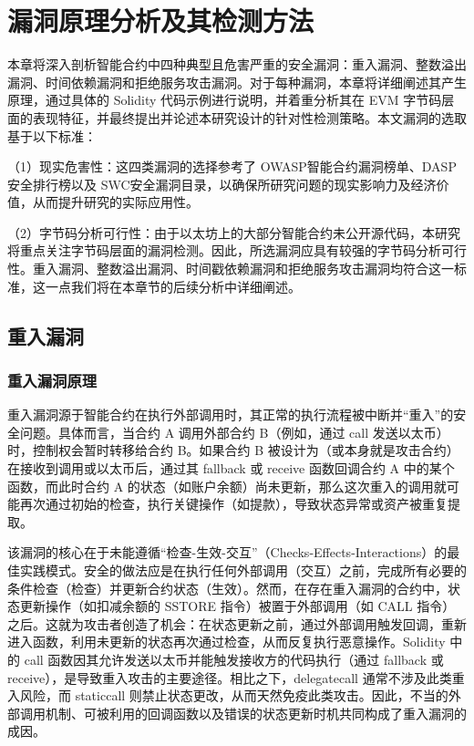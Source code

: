 \documentclass[print, master, vlined, timesmath]{DissertUESTC}
\begin{document}
\chapter{漏洞原理分析及其检测方法}
本章将深入剖析智能合约中四种典型且危害严重的安全漏洞：重入漏洞、整数溢出漏洞、时间依赖漏洞和拒绝服务攻击漏洞。对于每种漏洞，本章将详细阐述其产生原理，通过具体的 Solidity 代码示例进行说明，并着重分析其在 EVM 字节码层面的表现特征，并最终提出并论述本研究设计的针对性检测策略。本文漏洞的选取基于以下标准：

（1）现实危害性：这四类漏洞的选择参考了 OWASP智能合约漏洞榜单、DASP安全排行榜以及 SWC安全漏洞目录，以确保所研究问题的现实影响力及经济价值，从而提升研究的实际应用性。

（2）字节码分析可行性：由于以太坊上的大部分智能合约未公开源代码，本研究将重点关注字节码层面的漏洞检测。因此，所选漏洞应具有较强的字节码分析可行性。重入漏洞、整数溢出漏洞、时间戳依赖漏洞和拒绝服务攻击漏洞均符合这一标准，这一点我们将在本章节的后续分析中详细阐述。




\section{重入漏洞}

\subsection{重入漏洞原理}

重入漏洞源于智能合约在执行外部调用时，其正常的执行流程被中断并“重入”的安全问题。具体而言，当合约 A 调用外部合约 B（例如，通过 call 发送以太币）时，控制权会暂时转移给合约 B。如果合约 B 被设计为（或本身就是攻击合约）在接收到调用或以太币后，通过其 fallback 或 receive 函数回调合约 A 中的某个函数，而此时合约 A 的状态（如账户余额）尚未更新，那么这次重入的调用就可能再次通过初始的检查，执行关键操作（如提款），导致状态异常或资产被重复提取。

该漏洞的核心在于未能遵循“检查-生效-交互”（Checks-Effects-Interactions）的最佳实践模式。安全的做法应是在执行任何外部调用（交互）之前，完成所有必要的条件检查（检查）并更新合约状态（生效）。然而，在存在重入漏洞的合约中，状态更新操作（如扣减余额的 SSTORE 指令）被置于外部调用（如 CALL 指令）之后。这就为攻击者创造了机会：在状态更新之前，通过外部调用触发回调，重新进入函数，利用未更新的状态再次通过检查，从而反复执行恶意操作。Solidity 中的 call 函数因其允许发送以太币并能触发接收方的代码执行（通过 fallback 或 receive），是导致重入攻击的主要途径。相比之下，delegatecall 通常不涉及此类重入风险，而 staticcall 则禁止状态更改，从而天然免疫此类攻击。因此，不当的外部调用机制、可被利用的回调函数以及错误的状态更新时机共同构成了重入漏洞的成因。
\end{document}
